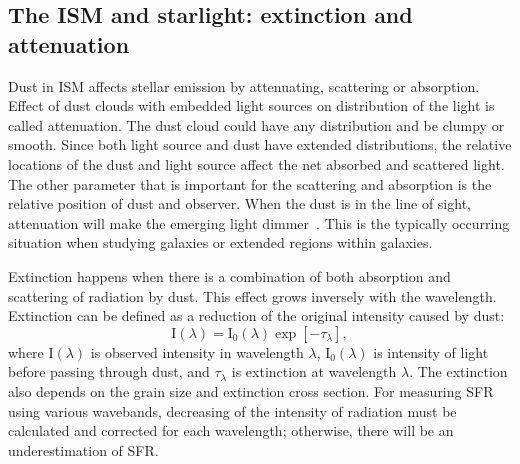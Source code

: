 \subsection{The ISM and starlight: extinction and attenuation}
\label{sec: extinction}
Dust in ISM affects stellar emission by attenuating, scattering or absorption.
Effect of dust clouds with embedded light sources on distribution of the light is called attenuation. 
The dust cloud could have any distribution and be clumpy or smooth. 
Since both light source and dust have extended distributions, the relative locations of the dust and light source affect the net absorbed and scattered light.
The other parameter that is important for the scattering and absorption is the relative position of dust and observer.
When the dust is in the line of sight, attenuation will make the emerging light dimmer~\citep[e.g.][and references therein]{Calzetti13}.
This is the typically occurring situation when studying galaxies or extended regions within galaxies.

Extinction happens when there is a combination of both absorption and scattering of radiation by dust.
This effect grows inversely with the wavelength.
Extinction can be defined as a reduction of the original intensity caused by dust:
\begin{equation}
\label{equ: extinction}
{\mathrm I}(\lambda) = {\mathrm I}_0(\lambda)\exp[-\tau_{\lambda}],
\end{equation}
where I$(\lambda)$ is observed intensity in wavelength $\lambda$, I$_0(\lambda)$ is intensity of light before passing through dust, and $\tau_{\lambda}$ is extinction at wavelength $\lambda$. %
The extinction also depends on the grain size and extinction cross section.
For measuring SFR using various wavebands, decreasing of the intensity of radiation must be calculated and corrected for each wavelength; otherwise, there will be an underestimation of SFR. 


